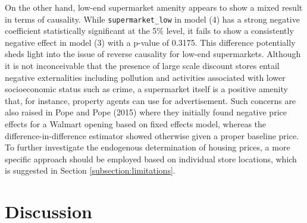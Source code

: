 \documentclass{article}
\begin{document}
On the other hand, low-end supermarket amenity appears to show a mixed result in terms of causality. While \texttt{supermarket\_low} in model (4) has a strong negative coefficient statistically significant at the 5\% level, it fails to show a consistently negative effect in model (3) with a p-value of 0.3175. This difference potentially sheds light into the issue of reverse causality for low-end supermarkets. Although it is not inconceivable that the presence of large scale discount stores entail negative externalities including pollution and activities associated with lower socioeconomic status such as crime, a supermarket itself is a positive amenity that, for instance, property agents can use for advertisement. Such concerns are also raised in Pope and Pope (2015) where they initially found negative price effects for a Walmart opening based on fixed effects model, whereas the difference-in-difference estimator showed otherwise given a proper baseline price. To further investigate the endogenous determination of housing prices, a more specific approach should be employed based on individual store locations, which is suggested in Section \ref{subsection:limitations}.
    
\section{Discussion} \label{section:discussion}
\end{document}
